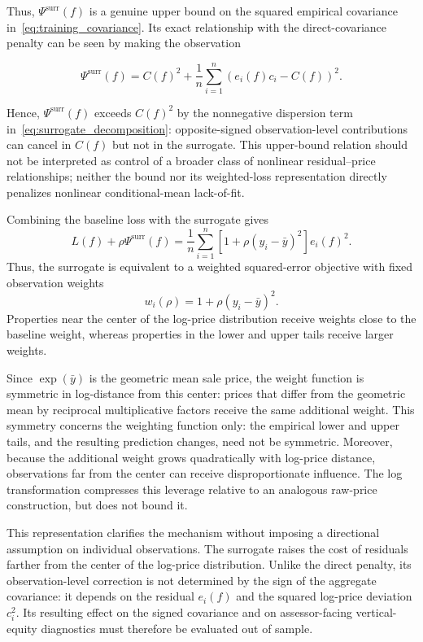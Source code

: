 \documentclass[10pt]{article}
\theoremstyle{definition}
\newcommand{\1}{\mathbf{1}}
\begin{document}
{
Thus, $\Psi^{\mathrm{surr}}(f)$ is a genuine upper bound on the squared empirical covariance in~\eqref{eq:training_covariance}. Its exact relationship with the direct-covariance penalty can be seen by making the observation


\begin{equation}
\label{eq:surrogate_decomposition}
\Psi^{\mathrm{surr}}(f)
=
C(f)^2
+
\frac{1}{n}
\sum_{i=1}^n
\left(e_i(f)c_i-C(f)\right)^2.
\end{equation}

Hence, $\Psi^{\mathrm{surr}}(f)$ exceeds $C(f)^2$ by the nonnegative dispersion term in~\eqref{eq:surrogate_decomposition}: opposite-signed observation-level contributions can cancel in $C(f)$ but not in the surrogate. This upper-bound relation should not be interpreted as control of a broader class of nonlinear residual--price relationships; neither the bound nor its weighted-loss representation directly penalizes nonlinear conditional-mean lack-of-fit.
}


Combining the baseline loss with the surrogate gives
\begin{equation}
\label{eq:surrogate_weighted_loss}
L(f)+\rho\Psi^{\mathrm{surr}}(f)
=
\frac{1}{n}\sum_{i=1}^n
\left[1+\rho(y_i-\bar y)^2\right]e_i(f)^2.
\end{equation}
Thus, the surrogate is equivalent to a weighted squared-error objective with fixed observation weights
\begin{equation}
\label{eq:surrogate_weights}
w_i(\rho)=1+\rho(y_i-\bar y)^2.
\end{equation}
Properties near the center of the log-price distribution receive weights close to the baseline weight, whereas properties in the lower and upper tails receive larger weights.


{Since $\exp(\bar y)$ is the geometric mean sale price, the weight function is symmetric in log-distance from this center: prices that differ from the geometric mean by reciprocal multiplicative factors receive the same additional weight. This symmetry concerns the weighting function only: the empirical lower and upper tails, and the resulting prediction changes, need not be symmetric. Moreover, because the additional weight grows quadratically with log-price distance, observations far from the center can receive disproportionate influence. The log transformation compresses this leverage relative to an analogous raw-price construction, but does not bound it.}


{This representation clarifies the mechanism without imposing a directional assumption on individual observations. The surrogate raises the cost of residuals farther from the center of the log-price distribution. Unlike the direct penalty, its observation-level correction is not determined by the sign of the aggregate covariance: it depends on the residual $e_i(f)$ and the squared log-price deviation $c_i^2$. Its resulting effect on the signed covariance and on assessor-facing vertical-equity diagnostics must therefore be evaluated out of sample.}
\end{document}
